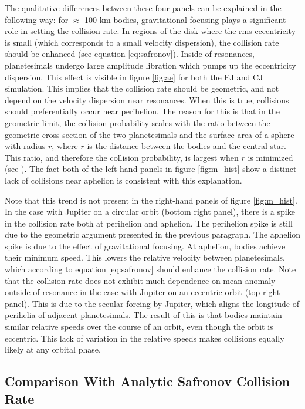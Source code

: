 \documentclass[twocolumn]{aastex63}
\begin{document}
The qualitative differences between these four panels can be explained in the following way: for $\approx$ 100 km bodies, gravitational focusing plays a significant role in setting the collision rate. In regions of the disk where the rms eccentricity is small (which corresponds to a small velocity dispersion), the collision rate should be enhanced (see equation \ref{eq:safronov}). Inside of resonances, planetesimals undergo large amplitude libration which pumps up the eccentricity dispersion. This effect is visible in figure \ref{fig:ae} for both the EJ and CJ simulation. This implies that the collision rate should be geometric, and not depend on the velocity dispersion near resonances. When this is true, collisions should preferentially occur near perihelion. The reason for this is that in the geometric limit, the collision probability scales with the ratio between the geometric cross section of the two planetesimals and the surface area of a sphere with radius $r$, where $r$ is the distance between the bodies and the central star. This ratio, and therefore the collision probability, is largest when $r$ is minimized (see \citet{2003AJ....125.2692L}). The fact both of the left-hand panels in figure \ref{fig:m_hist} show a distinct lack of collisions near aphelion is consistent with this explanation.

Note that this trend is not present in the right-hand panels of figure \ref{fig:m_hist}. In the case with Jupiter on a circular orbit (bottom right panel), there is a spike in the collision rate both at perihelion and aphelion. The perihelion spike is still due to the geometric argument presented in the previous paragraph. The aphelion spike is due to the effect of gravitational focusing. At aphelion, bodies achieve their minimum speed. This lowers the relative velocity between planetesimals, which according to equation \ref{eq:safronov} should enhance the collision rate. Note that the collision rate does not exhibit much dependence on mean anomaly outside of resonance in the case with Jupiter on an eccentric orbit (top right panel). This is due to the secular forcing by Jupiter, which aligns the longitude of perihelia of adjacent planetesimals. The result of this is that bodies maintain similar relative speeds over the course of an orbit, even though the orbit is eccentric. This lack of variation in the relative speeds makes collisions equally likely at any orbital phase.

\subsection{Comparison With Analytic Safronov Collision Rate}\label{sec:saf}
\end{document}

